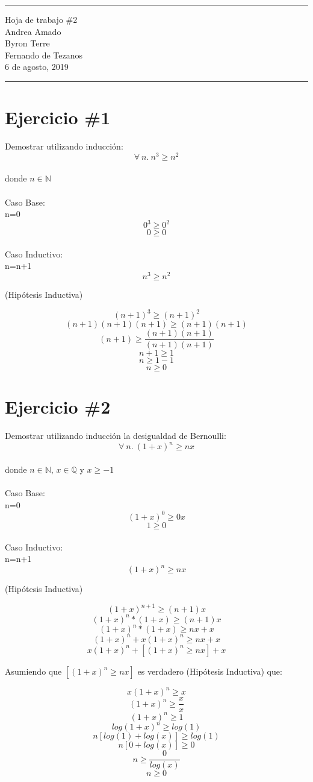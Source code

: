 \documentclass{article}
\newcommand{\horrule}[1]{\rule{\linewidth}{#1}}
\begin{document}
\begin{center}
        \horrule{0.5pt}
        \huge{Hoja de trabajo \#2} \\
        \large{Andrea Amado}\\
        \large{Byron Terre}\\
        \large{Fernando de Tezanos}\\
        \large{6 de agosto, 2019} \\
        \horrule{1pt}
\end{center}
\section*{Ejercicio \#1}
Demostrar utilizando inducci\'on:
\[
        \forall\ n.\ n^3\geq n^2
\]
\\donde $n\in\mathbb{N}$\\
\\
\large{Caso Base:}\\
n=0
\[
0^3\geq 0^2
\]
\[
0\geq 0
\]\\
\large{Caso Inductivo:}\\
n=n+1\\
\[
n^3\geq n^2 
\] \begin{center}(Hipótesis Inductiva)\end{center}
\[
(n+1)^3\geq (n+1)^2
\]
\[
(n+1)(n+1)(n+1)\geq (n+1)(n+1)
\]
\[
(n+1)\geq \frac{(n+1)(n+1)}{(n+1)(n+1)}
\]
\[
n+1\geq 1
\]
\[
n\geq 1-1
\]
\[
n\geq 0
\]

\section*{Ejercicio \#2}
Demostrar utilizando inducci\'on la desigualdad de Bernoulli:
\[
        \forall\ n.\ (1+x)^n\geq nx
\]
\\donde $n\in \mathbb{N}$, $x\in \mathbb{Q}$ y $x\geq -1$\\
\\
\large{Caso Base:}\\
n=0
\[
        (1+x)^0\geq 0x
\]
\[
        1\geq 0
\]\\
\large{Caso Inductivo:}\\
n=n+1\\
\[
        (1+x)^{n}\geq nx
\]\begin{center}(Hipótesis Inductiva)\end{center}
\[
        (1+x)^{n+1}\geq (n+1)x
\]
\[
        (1+x)^n*(1+x)\geq (n+1)x
\]
\[
        (1+x)^n*(1+x)\geq nx+x
\]
\[
        (1+x)^n+x(1+x)^n\geq nx+x
\]
\[
        x(1+x)^n+[(1+x)^n\geq nx]+x
\]\begin{center}Asumiendo que $[(1+x)^n\geq nx]$ es verdadero (Hipótesis Inductiva) que:\end{center}
\[
        x(1+x)^n\geq x
\]
\[
        (1+x)^n\geq \frac{x}{x}
\]
\[
        (1+x)^n\geq 1
\]
\[
        log(1+x)^n\geq log(1)
\]
\[
        n[log(1)+log(x)]\geq log(1)
\]
\[
        n[0+log(x)]\geq 0
\]
\[
        n\geq \frac{0}{log(x)}
\]
\[
        n\geq 0
\]
\end{document}
